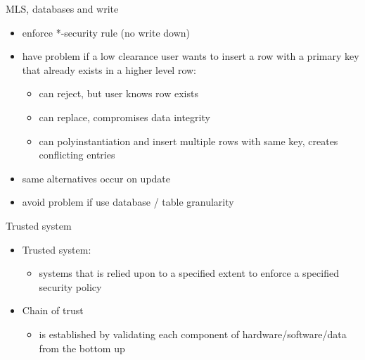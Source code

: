 \documentclass{beamer}
\begin{document}
\begin{frame}{MLS, databases and write}
  \begin{itemize}
  \item enforce *-security rule (no write down) 
  \item have problem if a low clearance user wants to 
    insert a row with a primary key that already exists 
    in a higher level row:
    \begin{itemize}
    \item can reject, but user knows row exists 
    \item can replace, compromises data integrity 
    \item can polyinstantiation and insert multiple rows with same 
      key, creates conflicting entries
    \end{itemize}
  \item same alternatives occur on update 
  \item avoid problem if use database / table granularity
  \end{itemize}
\end{frame}


\begin{frame}{Trusted system}
  \begin{itemize}
  \item Trusted system:
    \begin{itemize}
    \item systems that is relied upon to a specified extent to enforce a specified security policy
    \end{itemize}
  \item Chain of trust
    \begin{itemize}
    \item is established by validating each component of hardware/software/data from the bottom up
    \end{itemize}
  \end{itemize}
\end{frame}
\end{document}

